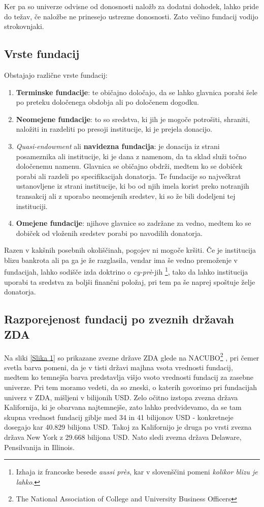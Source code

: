 \documentclass[12pt, a4paper]{article}
\begin{document}
Ker pa so univerze odvisne od donosnosti naložb za dodatni dohodek, lahko pride do težav, če naložbe ne prinesejo ustrezne donosnosti. Zato večino fundacij vodijo strokovnjaki.\\


\subsection{Vrste fundacij}
Obstajajo različne vrste fundacij:
\begin{enumerate}
\item \textbf{Terminske fundacije}: te običajno določajo, da se lahko glavnica porabi šele po preteku določenega obdobja ali po določenem dogodku.
\item \textbf{Neomejene fundacije}: to so sredstva, ki jih je mogoče potrošiti, shraniti, naložiti in razdeliti po presoji institucije, ki je prejela donacijo.
\item \textit{Quasi-endowment} ali \textbf{navidezna fundacija}: je donacija iz strani posameznika ali institucije, ki je dana z namenom, da ta sklad služi točno določenemu namenu. Glavnica se običajno obdrži, medtem ko se dobiček porabi ali razdeli po specifikacijah donatorja. Te fundacije so največkrat ustanovljene iz strani institucije, ki bo od njih imela korist preko notranjih transakcij ali z uporabo neomejenih sredstev, ki so že bili dodeljeni tej instituciji.
\item \textbf{Omejene fundacije}: njihove glavnice so zadržane za vedno, medtem ko se dobiček od vloženih sredstev porabi po navodilih donatorja.
\end{enumerate}

Razen v kakšnih posebnih okoliščinah, pogojev ni mogoče kršiti. Če je institucija blizu bankrota ali pa ga je že razglasila, vendar ima še vedno premoženje v fundacijah, lahko sodišče izda doktrino o \textit{cy-prè}-jih \footnote{Izhaja iz francoske besede \textit{aussi près}, kar v slovenščini pomeni \textit{kolikor blizu je lahko}.}, tako da lahko institucija uporabi ta sredstva za boljši finančni položaj, pri tem pa še naprej spoštuje želje donatorja.

\subsection{Razporejenost fundacij po zveznih državah ZDA}

Na sliki \ref{Slika 1}  so prikazane zvezne države ZDA glede na NACUBO\footnote{The National Association of College and University Business Officers} \cite{wiki}, pri čemer svetla barva pomeni, da je v tisti državi majhna vsota vrednosti fundacij, medtem ko temnejša barva predstavlja višjo vsoto vrednosti fundacij za zasebne univerze. Pri tem moramo vedeti, da so zneski, o katerih govorimo pri fundacijah univerz v ZDA, mišljeni v bilijonih USD. Zelo očitno izstopa zvezna država Kalifornija, ki je obarvana najtemnejše, zato lahko predvidevamo, da se tam skupna vrednost fundacij giblje med 34 in 41 bilijonov USD - konkretneje dosegajo kar 40.829 bilijona USD. Takoj za Kalifornijo je druga po vrsti zvezna država New York z 29.668 bilijona USD. Nato sledi zvezna država Delaware, Pensilvanija in Illinois. \\
\end{document}
